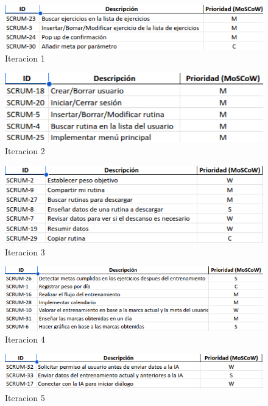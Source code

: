\begin{figure}[H]
   \centering
    \includegraphics[width=1.2\textwidth]{tablas/iter1.png}
    \caption{Iteracion 1}
    \label{fig:iter1}
\end{figure}

\begin{figure}[H]
   \centering
    \includegraphics[width=1.1\textwidth]{tablas/iter2.png}
    \caption{Iteracion 2}
    \label{fig:iter2}
\end{figure}

\begin{figure}[H]
   \centering
    \includegraphics[width=1.2\textwidth]{tablas/iter3.png}
    \caption{Iteracion 3}
    \label{fig:iter3}
\end{figure}

\begin{figure}[H]
   \centering
    \includegraphics[width=1.25\textwidth]{tablas/iter4.png}
    \caption{Iteracion 4}
    \label{fig:iter4}
\end{figure}

\begin{figure}[H]
   \centering
    \includegraphics[width=1.25\textwidth]{tablas/iter5.png}
    \caption{Iteracion 5}
    \label{fig:iter5}
\end{figure}

